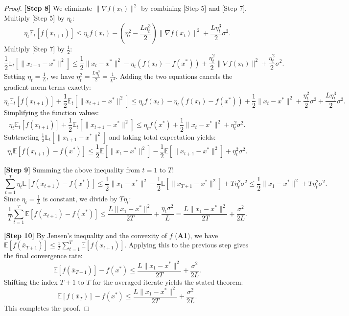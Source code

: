 \documentclass[11pt]{article}
\begin{document}
\begin{proof}
\textbf{[Step 8]} We eliminate $\|\nabla f(x_t)\|^2$ by combining [Step 5] and [Step 7]. Multiply [Step 5] by $\eta_t$:
$$ \eta_t \mathbb{E}_t[f(x_{t+1})] \le \eta_t f(x_t) - (\eta_t^2 - \frac{L \eta_t^3}{2}) \|\nabla f(x_t)\|^2 + \frac{L \eta_t^3}{2} \sigma^2. $$
Multiply [Step 7] by $\frac{1}{2}$:
$$ \frac{1}{2} \mathbb{E}_t[\|x_{t+1} - x^*\|^2] \le \frac{1}{2} \|x_t - x^*\|^2 - \eta_t (f(x_t) - f(x^*)) + \frac{\eta_t^2}{2} \|\nabla f(x_t)\|^2 + \frac{\eta_t^2}{2} \sigma^2. $$
Setting $\eta_t = \frac{1}{L}$, we have $\eta_t^2 = \frac{L \eta_t^3}{2} = \frac{1}{L^2}$. Adding the two equations cancels the gradient norm terms exactly:
$$ \eta_t \mathbb{E}_t[f(x_{t+1})] + \frac{1}{2} \mathbb{E}_t[\|x_{t+1} - x^*\|^2] \le \eta_t f(x_t) - \eta_t (f(x_t) - f(x^*)) + \frac{1}{2} \|x_t - x^*\|^2 + \frac{\eta_t^2}{2} \sigma^2 + \frac{L \eta_t^3}{2} \sigma^2. $$
Simplifying the function values:
$$ \eta_t \mathbb{E}_t[f(x_{t+1})] + \frac{1}{2} \mathbb{E}_t[\|x_{t+1} - x^*\|^2] \le \eta_t f(x^*) + \frac{1}{2} \|x_t - x^*\|^2 + \eta_t^2 \sigma^2. $$
Subtracting $\frac{1}{2} \mathbb{E}_t[\|x_{t+1} - x^*\|^2]$ and taking total expectation yields:
$$ \eta_t \mathbb{E}[f(x_{t+1}) - f(x^*)] \le \frac{1}{2} \mathbb{E}[\|x_t - x^*\|^2] - \frac{1}{2} \mathbb{E}[\|x_{t+1} - x^*\|^2] + \eta_t^2 \sigma^2. $$

\textbf{[Step 9]} Summing the above inequality from $t=1$ to $T$:
$$ \sum_{t=1}^T \eta_t \mathbb{E}[f(x_{t+1}) - f(x^*)] \le \frac{1}{2} \|x_1 - x^*\|^2 - \frac{1}{2} \mathbb{E}[\|x_{T+1} - x^*\|^2] + T \eta_t^2 \sigma^2 \le \frac{1}{2} \|x_1 - x^*\|^2 + T \eta_t^2 \sigma^2. $$
Since $\eta_t = \frac{1}{L}$ is constant, we divide by $T \eta_t$:
$$ \frac{1}{T} \sum_{t=1}^T \mathbb{E}[f(x_{t+1}) - f(x^*)] \le \frac{L \|x_1 - x^*\|^2}{2T} + \frac{\eta_t \sigma^2}{L} = \frac{L \|x_1 - x^*\|^2}{2T} + \frac{\sigma^2}{2L}. $$

\textbf{[Step 10]} By Jensen's inequality and the convexity of $f$ (\textbf{A1}), we have $\mathbb{E}[f(\bar{x}_{T+1})] \le \frac{1}{T} \sum_{t=1}^T \mathbb{E}[f(x_{t+1})]$. Applying this to the previous step gives the final convergence rate:
$$ \mathbb{E}[f(\bar{x}_{T+1})] - f(x^*) \le \frac{L \|x_1 - x^*\|^2}{2T} + \frac{\sigma^2}{2L}. $$
Shifting the index $T+1$ to $T$ for the averaged iterate yields the stated theorem:
$$ \mathbb{E}[f(\bar{x}_T)] - f(x^*) \le \frac{L \|x_1 - x^*\|^2}{2T} + \frac{\sigma^2}{2L}. $$
This completes the proof.
\end{proof}
\end{document}
